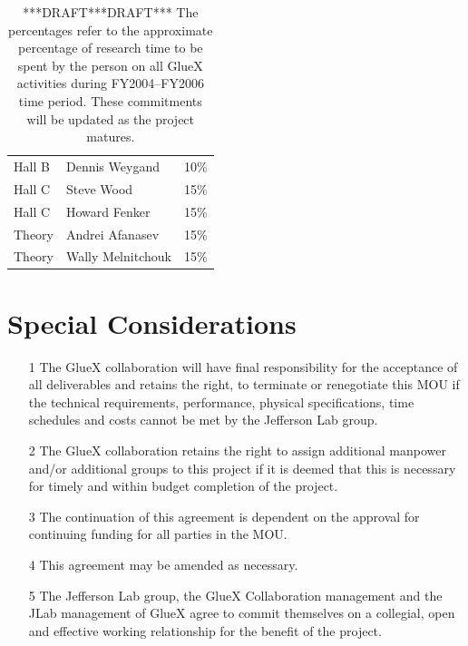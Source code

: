 \documentclass[oneside,12pt,letterpaper]{article}
\newcommand{\gx}{\mbox{GlueX}}
\newcommand{\instname}{Jefferson Lab}
\begin{document}
\begin{table}[h!]
\begin{center}
\begin{tabular}{llc}
Hall B             & Dennis Weygand             & 10\%  \\
Hall C             & Steve Wood		        & 15\%   \\
Hall C             & Howard Fenker              & 15\%   \\
Theory             & Andrei Afanasev            & 15\%   \\
Theory		   & Wally Melnitchouk		& 15\%   \\
\end{tabular}
\caption[]{\label{tab:halldpersonnel} ***DRAFT***DRAFT***
The percentages refer to the approximate percentage of research time to be
spent by the person on all \gx{} activities during FY2004--FY2006 time
period. These commitments will be updated as the project matures.}
\end{center} 
\end{table}

\section{Special Considerations}
\begin{enumerate}
\item[1] The \gx{} collaboration will have final responsibility for 
the acceptance of all deliverables and retains the right, to terminate 
or renegotiate this MOU if the technical requirements, performance, 
physical specifications, time schedules and costs cannot be met by the 
\instname{} group.
\item[2] The \gx{} collaboration retains the right to assign additional
manpower and/or additional groups to this project if it is deemed that
this is necessary for timely and within budget completion of the project.
\item[3] The continuation of this agreement is dependent on the approval 
for continuing  funding for all parties in the MOU.
\item[4] This agreement may be amended as necessary.
\item[5] The \instname{} group, the \gx{} Collaboration management and the 
JLab management of \gx{} agree to commit themselves on a collegial, open and
effective working relationship for the benefit of the project.
\end{enumerate}



\end{document}
